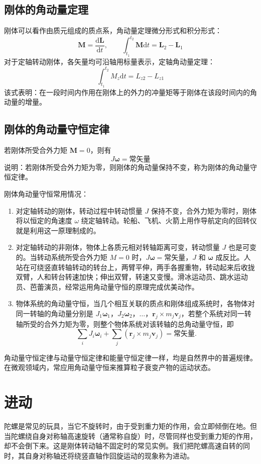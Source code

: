     \subsection{刚体的角动量定理}
    刚体可以看作由质元组成的质点系，角动量定理微分形式和积分形式：
    \[
    \boldsymbol{M}=\frac{\mathrm{d}\boldsymbol{L}}{\mathrm{d}t},\qquad \int_{t_1}^{t_2} \boldsymbol{M}\mathrm{d}t=\boldsymbol{L}_2-\boldsymbol{L}_1
    \]
    对于定轴转动刚体，各矢量均可沿轴用标量表示，定轴角动量定理：
    \[
    \int_{t_1}^{t_2} M_z \mathrm{d}t = L_{z2}-L_{z1}
    \]
    该式表明：在一段时间内作用在刚体上的外力的冲量矩等于刚体在该段时间内的角动量的增量。

    \subsection{刚体的角动量守恒定律}
    若刚体所受合外力矩 $\boldsymbol{M}=0$，则有
    \[
    J\boldsymbol{\omega}=\text{常矢量}
    \]
    说明：若刚体所受合外力矩为零，则刚体的角动量保持不变，称为刚体的角动量守恒定律。

    刚体角动量守恒常用情况：
    \begin{enumerate}
        \item 对定轴转动的刚体，转动过程中转动惯量 $J$ 保持不变，合外力矩为零时，刚体将以恒定的角速度 $\omega$ 绕定轴转动。轮船、飞机、火箭上用作导航定向的回转仪就是利用这一原理制成的。
        \item 对定轴转动的非刚体，物体上各质元相对转轴距离可变，转动惯量 $J$ 也是可变的。当转动系统所受合外力矩 $M=0$ 时，$J\boldsymbol{\omega}=$常矢量，$J$ 和 $\boldsymbol{\omega}$ 成反比。人站在可绕竖直转轴转动的转台上，两臂平伸，两手各握重物，转动起来后收拢双臂，人和转台转速加快；伸出双臂，转速又变慢。滑冰运动员、跳水运动员、芭蕾演员，经常运用角动量守恒的原理完成优美动作。
        \item 物体系统的角动量守恒，当几个相互关联的质点和刚体组成系统时，各物体对同一转轴的角动量分别是 $J_1\boldsymbol{\omega}_1$，$J_2\boldsymbol{\omega}_2$，$\dots$，$\boldsymbol{r}_j\times m_j \boldsymbol{v}_j$，若整个系统对同一转轴所受的合外力矩为零，则整个物体系统对该转轴的总角动量守恒，即
        \[
        \sum_i J_i \boldsymbol{\omega}_i + \sum_j (\boldsymbol{r}_j \times m_j \boldsymbol{v}_j) = \text{常矢量}.
        \]
    \end{enumerate}
    角动量守恒定律与动量守恒定律和能量守恒定律一样，均是自然界中的普遍规律。在微观领域内，常应用角动量守恒来推算粒子衰变产物的运动状态。

\section{进动}
    陀螺是常见的玩具，当它不旋转时，由于受到重力矩的作用，会立即倾倒在地。但当陀螺绕自身对称轴高速旋转（通常称自旋）时，尽管同样也受到重力矩的作用，却不会倒下来。这是刚体转动轴不固定时的常见实例。我们把陀螺高速自转的同时，其自身对称轴还将绕竖直轴作回旋运动的现象称为进动。

